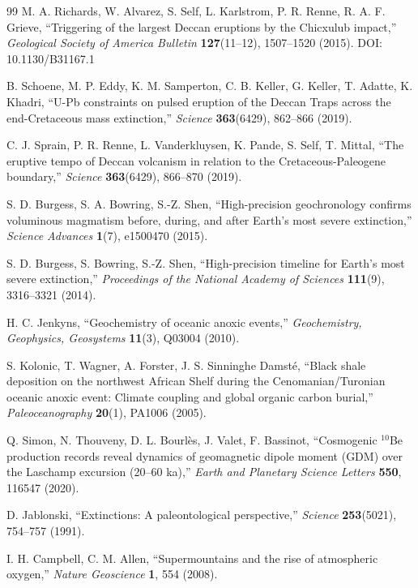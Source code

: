 \documentclass[12pt,a4paper]{article}
\begin{document}
\begin{thebibliography}{99}
		M. A. Richards, W. Alvarez, S. Self, L. Karlstrom, P. R. Renne, R. A. F. Grieve, ``Triggering of the largest Deccan eruptions by the Chicxulub impact,''
		\emph{Geological Society of America Bulletin} \textbf{127}(11–12), 1507–1520 (2015). DOI: 10.1130/B31167.1
		
		B. Schoene, M. P. Eddy, K. M. Samperton, C. B. Keller, G. Keller, T. Adatte, K. Khadri, ``U-Pb constraints on pulsed eruption of the Deccan Traps across the end-Cretaceous mass extinction,''
		\emph{Science} \textbf{363}(6429), 862–866 (2019).
		
		C. J. Sprain, P. R. Renne, L. Vanderkluysen, K. Pande, S. Self, T. Mittal, ``The eruptive tempo of Deccan volcanism in relation to the Cretaceous-Paleogene boundary,''
		\emph{Science} \textbf{363}(6429), 866–870 (2019).
		
		S. D. Burgess, S. A. Bowring, S.-Z. Shen, ``High-precision geochronology confirms voluminous magmatism before, during, and after Earth's most severe extinction,''
		\emph{Science Advances} \textbf{1}(7), e1500470 (2015).
		
		S. D. Burgess, S. Bowring, S.-Z. Shen, ``High-precision timeline for Earth's most severe extinction,''
		\emph{Proceedings of the National Academy of Sciences} \textbf{111}(9), 3316–3321 (2014).
		
		H. C. Jenkyns, ``Geochemistry of oceanic anoxic events,''
		\emph{Geochemistry, Geophysics, Geosystems} \textbf{11}(3), Q03004 (2010).
		
		S. Kolonic, T. Wagner, A. Forster, J. S. Sinninghe Damsté, ``Black shale deposition on the northwest African Shelf during the Cenomanian/Turonian oceanic anoxic event: Climate coupling and global organic carbon burial,''
		\emph{Paleoceanography} \textbf{20}(1), PA1006 (2005).
		
		Q. Simon, N. Thouveny, D. L. Bourlès, J. Valet, F. Bassinot, ``Cosmogenic \(^{10}\)Be production records reveal dynamics of geomagnetic dipole moment (GDM) over the Laschamp excursion (20–60 ka),''
		\emph{Earth and Planetary Science Letters} \textbf{550}, 116547 (2020).
		
		D. Jablonski, ``Extinctions: A paleontological perspective,''
		\emph{Science} \textbf{253}(5021), 754–757 (1991).
		
		I. H. Campbell, C. M. Allen, ``Supermountains and the rise of atmospheric oxygen,''
		\emph{Nature Geoscience} \textbf{1}, 554 (2008).
		

\end{thebibliography}
\end{document}
